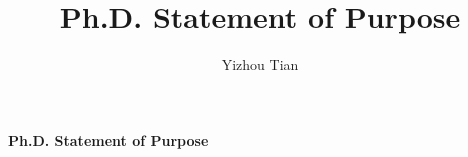\documentclass[11pt]{article}
\title{Ph.D. Statement of Purpose}
\author{Yizhou Tian}
\affil{University of Chicago}
\begin{document}
% 



\begin{center}
    {\Large{\textbf{Ph.D. Statement of Purpose }}}\\
\end{center}





















\clearpage


\end{document}
